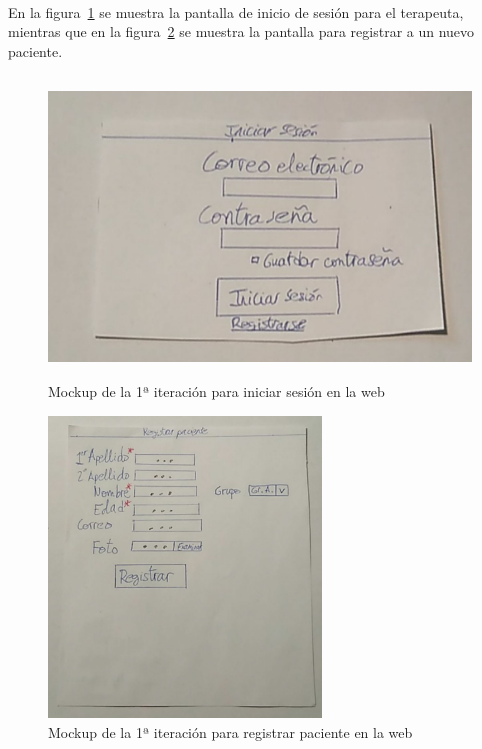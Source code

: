 \paragraph{}
En la figura~\ref{c4:fig:v1:web:iniciarSesion} se muestra la pantalla de inicio de sesión para el terapeuta, mientras que en la figura~\ref{c4:fig:v1:web:registrarPaciente} se muestra la pantalla para registrar a un nuevo paciente.

\begin{figure}[H]
    \centering
    \includegraphics[width=0.7\linewidth, height=8cm]{Imagenes/04DescProblema/mockups/v1/web/01-iniciarSesion.jpg}
    \caption[Mockup de la 1ª iteración para iniciar sesión en la web]{Mockup de la 1ª iteración para iniciar sesión en la web}
    \label{c4:fig:v1:web:iniciarSesion}
\end{figure}

\begin{figure}[H]
    \centering
    \includegraphics[width=0.7\linewidth, height=8cm]{Imagenes/04DescProblema/mockups/v1/web/02-registrarPaciente.jpg}
    \caption[Mockup de la 1ª iteración para registrar paciente en la web]{Mockup de la 1ª iteración para registrar paciente en la web}
    \label{c4:fig:v1:web:registrarPaciente}
\end{figure}

